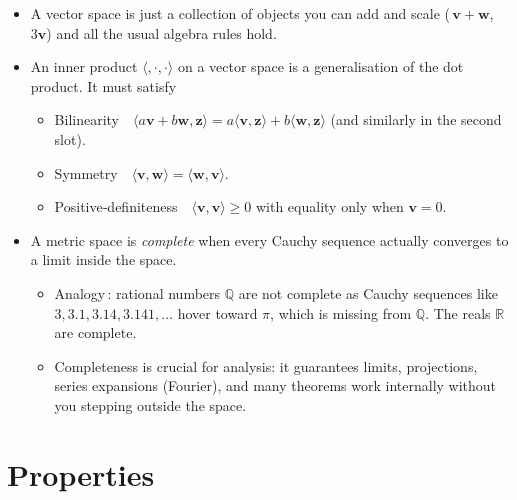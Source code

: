 \begin{itemize}
	\item A vector space is just a collection of objects you can add and scale (\eg $\mathbf v + \mathbf w$, $3\mathbf v$) and all the usual algebra rules hold.
	\item An inner product $\langle,\cdot,\cdot\rangle$ on a vector space is a generalisation of the dot product. It must satisfy
		\begin{itemize}
			\item Bilinearity $\langle a\mathbf v + b\mathbf w,\mathbf z\rangle = a\langle\mathbf v,\mathbf z\rangle + b\langle\mathbf w,\mathbf z\rangle$ (and similarly in the second slot).
			\item Symmetry $\langle\mathbf v,\mathbf w\rangle = \langle\mathbf w,\mathbf v\rangle$.
			\item Positive‑definiteness $\langle\mathbf v,\mathbf v\rangle \ge 0$ with equality only when $\mathbf v=0$.
		\end{itemize}
	\item A metric space is \textit{complete} when every Cauchy sequence actually converges to a limit inside the space. 
		\begin{itemize}
			\item Analogy : rational numbers $\mathbb Q$ are not complete as Cauchy sequences like $3, 3.1, 3.14, 3.141,\dots$ hover toward $\pi$, which is missing from $\mathbb Q$. The reals $\mathbb R$ are complete. 
			\item Completeness is crucial for analysis: it guarantees limits, projections, series expansions (\eg Fourier), and many theorems work internally without you stepping outside the space.
		\end{itemize}
\end{itemize}





\section{Properties}

